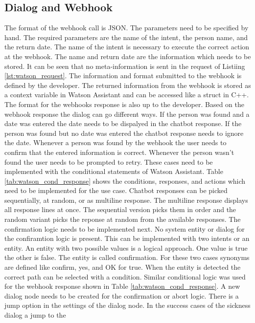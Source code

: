 \subsection{Dialog and Webhook}
The format of the webhook call is JSON.
The parameters need to be specified by hand.
The required parameters are the name of the intent, the person name, and the 
return date.
The name of the intent is necessary to execute the correct action at the webhook.
The name and return date are the information which needs to be stored.
It can be seen that no meta-information is sent in the request of Listiing \ref{lst:watson_request}.
The information and format submitted to the webhook is defined by the developer.
The returned information from the webhook is stored as a context variable in Watson Assistant and 
can be accessed like a struct in C++. 
The format for the webhooks response is also up to the developer.
Based on the webhook response the dialog can go different ways.
If the person was found and a date was entered the date needs to be dispalyed in the chatbot response.
If the person was found but no date was entered the chatbot response needs to ignore the date.
Whenever a person was found by the webhook the user needs to confirm that the entered information is correct.
Whenever the person wasn't found the user needs to be prompted to retry.
These cases need to be implemented with the conditional statements of Watson Assistant.
Table \ref{tab:watson_cond_response} shows the conditions, responses, and actions which need 
to be implemented for the use case.
Chatbot responses can be picked sequentially, at random, or as multiline response.
The multiline response displays all response lines at once.
The sequential version picks them in order and the random variant picks the reponse at random from 
the available responses.
The confirmation logic needs to be implemented next.
No system entity or dialog for the confiramtion logic is present.
This can be implemented with two intents or an entity.
An entity with two possible values is a logical approach.
One value is true the other is false.
The entity is called confirmation.
For these two cases synonyms are defined like confirm, yes, and OK for true.
When the entity is detected the correct path can be selected with a condition.
Similar conditional logic was used for the webhook response shown 
in Table \ref{tab:watson_cond_response}.
A new dialog node needs to be created for the confirmation or abort 
logic.
There is a jump option in the settings of the dialog node.
In the success cases of the sickness dialog a jump to the 
